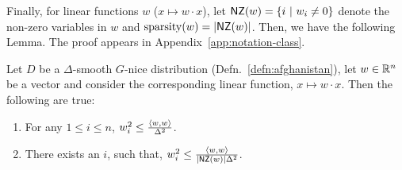 
Finally, for linear functions $w$ ($x \mapsto w \cdot x$), let $\mathsf{NZ}(w) = \{ i
~|~ w_i \neq 0 \}$ denote the non-zero variables in $w$ and $\mathrm{sparsity}(w) =
|\mathsf{NZ}(w)|$. Then, we have the following Lemma. The proof appears in
Appendix~\ref{app:notation-class}.

\begin{lemma} \label{lemma:amsterdam} Let $D$ be a $\Delta$-smooth $G$-nice
distribution (Defn.~\ref{defn:afghanistan}), let $w \in \mathbb{R}^n$ be a vector
and consider the corresponding linear function, $x \mapsto w \cdot x$. Then the
following are true:
\begin{enumerate}
\item For any $1 \leq i \leq n$, $w_i^2 \leq \frac{\langle w, w \rangle}{\Delta^2}$.
\item There exists an $i$, such that, $w_i^2 \leq
\frac{\langle w, w \rangle}{|\mathsf{NZ}(w)|\Delta^2}$.
\end{enumerate}
\end{lemma}

